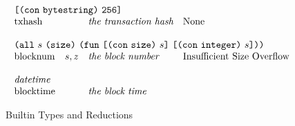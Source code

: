 \documentclass[../main.tex]{subfiles}
\begin{document}
\begin{figure*}[t]
\[\begin{array}{llll}
        \multicolumn{4}{l}{\appT{\conT{\conBytestringType{}}}{\size{256}}}\\
        \mathrm{txhash} & & \textit{the transaction hash}   &   \textrm{None}  \\
        &&\\
        
        \multicolumn{4}{l}{
          \allT{s}{\sizeK{}}{
            \funT{\appT{\conT{\conSizeType{}}}{s}}
                 {\appT{\conT{\conIntegerType{}}}{s}}}}\\
        \mathrm{blocknum} & s, z & \textit{the block number}   &   \textrm{Insufficient Size Overflow}  \\
        &&\\
        
        \multicolumn{4}{l}{\mathit{datetime}}\\
        \mathrm{blocktime} & & \textit{the block time}   &   \textrm{}  \\
    \end{array}\]
    \normalsize
    \caption{Builtin Types and Reductions}
    \label{fig:Plutus_core_builtins}
\end{figure*}
\end{document}
